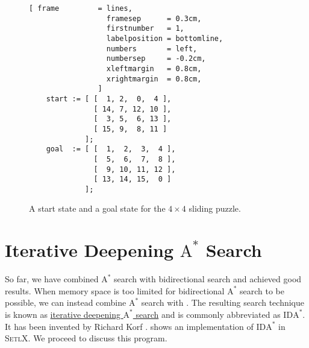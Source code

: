 \begin{figure}[!ht]
\centering
\begin{Verbatim}[ frame         = lines,
                  framesep      = 0.3cm,
                  firstnumber   = 1,
                  labelposition = bottomline,
                  numbers       = left,
                  numbersep     = -0.2cm,
                  xleftmargin   = 0.8cm,
                  xrightmargin  = 0.8cm,
                ]
    start := [ [  1, 2,  0,  4 ],
               [ 14, 7, 12, 10 ],
               [  3, 5,  6, 13 ],
               [ 15, 9,  8, 11 ]
             ];
    goal  := [ [  1,  2,  3,  4 ],
               [  5,  6,  7,  8 ],
               [  9, 10, 11, 12 ],
               [ 13, 14, 15,  0 ]
             ];
\end{Verbatim}
\vspace*{-0.3cm}
\caption{A start state and a goal state for the $4 \times 4$ sliding puzzle.}
\label{fig:start-goal.stlx}
\end{figure}


\section{Iterative Deepening $\mathrm{A}^*$ Search}
So far, we have combined $\mathrm{A}^*$ search with bidirectional search and achieved good results.  When
memory space is too limited for bidirectional $\mathrm{A}^*$ search to be possible, we can instead
combine $\mathrm{A}^*$ search with .  The resulting search technique is known as
\href{https://en.wikipedia.org/wiki/Iterative_deepening_A*}{\color{blue}iterative deepening $\mathrm{A}^*$ search}
and is commonly abbreviated as $\mathrm{IDA}^*$.  It has been invented by Richard Korf \cite{korf:1985}.
shows an implementation of $\mathrm{IDA}^*$ in \textsc{SetlX}.  We proceed to discuss this program.

